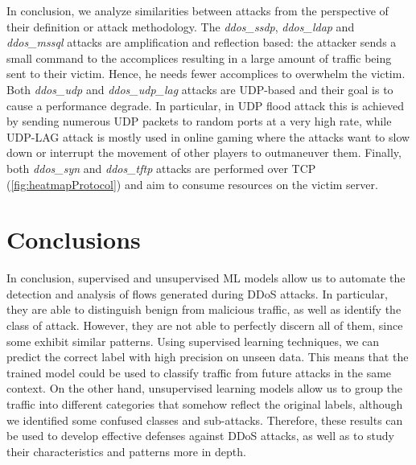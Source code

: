 \documentclass[acmlarge,nonacm]{acmart}
\begin{document}
In conclusion, we analyze similarities between attacks from the perspective of their definition or attack methodology. The \emph{ddos\_ssdp}, \emph{ddos\_ldap} and \emph{ddos\_mssql} attacks are amplification and reflection based: the attacker sends a small command to the accomplices resulting in a large amount of traffic being sent to their victim. Hence, he needs fewer accomplices to overwhelm the victim. Both \emph{ddos\_udp} and \emph{ddos\_udp\_lag} attacks are UDP-based and their goal is to cause a performance degrade. In particular, in UDP flood attack this is achieved by sending numerous UDP packets to random ports at a very high rate, while UDP-LAG attack is mostly used in online gaming where the attacks want to slow down or interrupt the movement of other players to outmaneuver them. Finally, both \emph{ddos\_syn} and \emph{ddos\_tftp} attacks are performed over TCP (\cref{fig:heatmapProtocol}) and aim to consume resources on the victim server.

\section{Conclusions}
In conclusion, supervised and unsupervised ML models allow us to automate the detection and analysis of flows generated during DDoS attacks. In particular, they are able to distinguish benign from malicious traffic, as well as identify the class of attack. However, they are not able to perfectly discern all of them, since some exhibit similar patterns. Using supervised learning techniques, we can predict the correct label with high precision on unseen data. This means that the trained model could be used to classify traffic from future attacks in the same context. On the other hand, unsupervised learning models allow us to group the traffic into different categories that somehow reflect the original labels, although we identified some confused classes and sub-attacks. Therefore, these results can be used to develop effective defenses against DDoS attacks, as well as to study their characteristics and patterns more in depth.

\clearpage
\nocite{*}



\clearpage
\appendix
\end{document}
